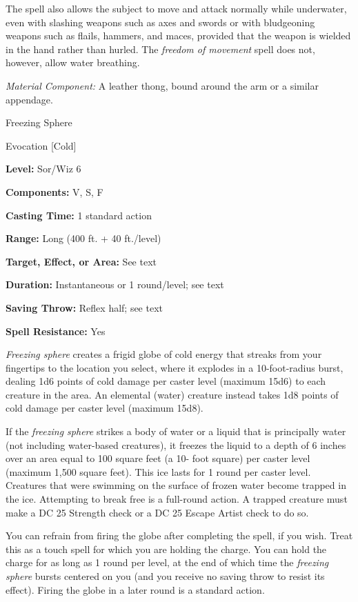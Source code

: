 \documentclass{article}
\begin{document}
The spell also allows the subject to move and attack normally while underwater, 
even with slashing weapons such as axes and swords or with bludgeoning weapons 
such as flails, hammers, and maces, provided that the weapon is wielded in the 
hand rather than hurled. The \textit{freedom of movement }spell does not, however, 
allow water breathing.

\textit{Material Component: }A leather thong, bound around the arm or a similar 
appendage.

\vspace{12pt}
Freezing Sphere

Evocation [Cold]

\textbf{Level:} Sor/Wiz 6

\textbf{Components:} V, S, F

\textbf{Casting Time:} 1 standard action

\textbf{Range:} Long (400 ft. + 40 ft./level)

\textbf{Target, Effect, or Area:} See text

\textbf{Duration:} Instantaneous or 1 round/level; see text

\textbf{Saving Throw:} Reflex half; see text

\textbf{Spell Resistance:} Yes

\textit{Freezing sphere }creates a frigid globe of cold energy that streaks from 
your fingertips to the location you select, where it explodes in a 10-foot-radius 
burst, dealing 1d6 points of cold damage per caster level (maximum 15d6) to each 
creature in the area. An elemental (water) creature instead takes 1d8 points of 
cold damage per caster level (maximum 15d8).

If the \textit{freezing sphere }strikes a body of water or a liquid that is principally 
water (not including water-based creatures), it freezes the liquid to a depth of 
6 inches over an area equal to 100 square feet (a 10- foot square) per caster level 
(maximum 1,500 square feet). This ice lasts for 1 round per caster level. Creatures 
that were swimming on the surface of frozen water become trapped in the ice. Attempting 
to break free is a full-round action. A trapped creature must make a DC 25 Strength 
check or a DC 25 Escape Artist check to do so.

You can refrain from firing the globe after completing the spell, if you wish. 
Treat this as a touch spell for which you are holding the charge. You can hold 
the charge for as long as 1 round per level, at the end of which time the \textit{freezing 
sphere }bursts centered on you (and you receive no saving throw to resist its effect). 
Firing the globe in a later round is a standard action.
\end{document}
